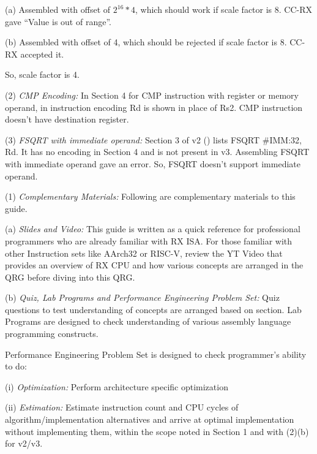     \leveltwo
    (a) Assembled with offset of $2^{16} * 4$, which should work if scale factor is 8. CC-RX gave 
    ``Value is out of range''. 

    (b) Assembled with offset of 4, which should be rejected if scale factor is 8. CC-RX accepted it.

\levelone
So, scale factor is 4.

(2) \emph{CMP Encoding:} %
In Section 4 for CMP instruction with register or memory operand, in instruction encoding Rd is shown 
in place of Rs2. CMP instruction doesn't have destination register.

(3) \emph{FSQRT with immediate operand:} %
Section 3 of v2 (\cite{rx_v2_um}) lists FSQRT \#IMM:32, Rd. It has no encoding in Section 4 and is not 
present in v3. Assembling FSQRT with immediate operand gave an error. So, FSQRT doesn't support immediate 
operand.



\SOPNoteBody

(1) \emph{Complementary Materials:} %
Following are complementary materials to this guide.

    \leveltwo
    (a) \emph{Slides and Video:} %
    This guide is written as a quick reference for professional programmers who are already familiar 
    with RX ISA. For those familiar with other Instruction sets like AArch32 or RISC-V, review the 
    YT Video that provides an overview of RX CPU and how various concepts are arranged in the QRG before
    diving into this QRG.

    (b) \emph{Quiz, Lab Programs and Performance Engineering Problem Set:} %
    Quiz questions to test understanding of concepts are arranged based on section. Lab Programs 
    are designed to check understanding of various assembly language programming constructs.

    Performance Engineering Problem Set is designed to check programmer's ability to do:
    
        \levelthree
        (i) \emph{Optimization:} %
        Perform architecture specific optimization
        
        (ii) \emph{Estimation:} %
        Estimate instruction count and CPU cycles of algorithm/implementation alternatives and 
        arrive at optimal implementation without implementing them, within the scope noted in 
        Section 1 and with (2)(b) for v2/v3.
        
